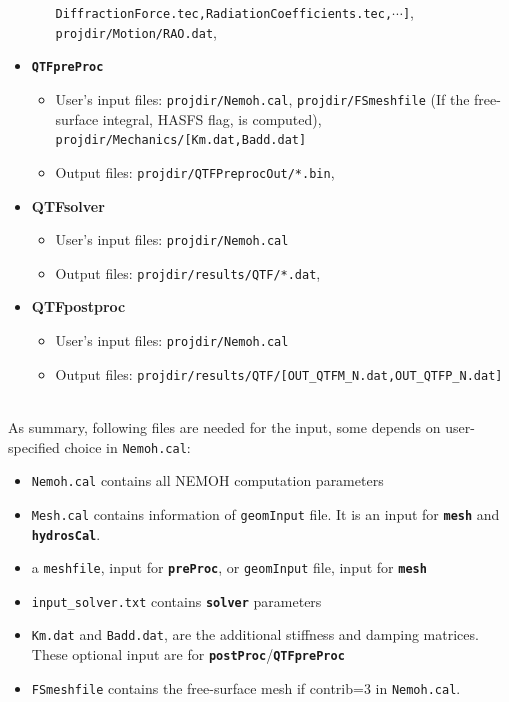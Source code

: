 \documentclass[12pt,a4paper,titlepage]{article}
\begin{document}
\begin{itemize}
\begin{itemize}
\texttt{DiffractionForce.tec,RadiationCoefficients.tec,$\cdots$]},\\ \texttt{projdir/Motion/RAO.dat},
\end{itemize}
\item \texttt{\textbf{QTFpreProc}}
\begin{itemize}
\item User's input files: \texttt{projdir/Nemoh.cal}, \texttt{projdir/FSmeshfile} (If the free-surface integral, HASFS flag, is computed), \\ \texttt{projdir/Mechanics/[Km.dat,Badd.dat]}
\item Output files: \texttt{projdir/QTFPreprocOut/*.bin},
\end{itemize}
\item \textbf{QTFsolver}
\begin{itemize}
\item User's input files: \texttt{projdir/Nemoh.cal}
\item Output files: \texttt{projdir/results/QTF/*.dat},
\end{itemize}
\item \textbf{QTFpostproc}
\begin{itemize}
\item User's input files: \texttt{projdir/Nemoh.cal}
\item Output files: \texttt{projdir/results/QTF/[OUT\_QTFM\_N.dat,OUT\_QTFP\_N.dat]}
\end{itemize}
\end{itemize}
\ \\
As summary, following files are needed for the input, some depends on user-specified choice in \texttt{Nemoh.cal}:
\begin{itemize}
\item \texttt{Nemoh.cal} contains all NEMOH computation parameters
\item \texttt{Mesh.cal} contains information of \texttt{geomInput} file. It is an input for \texttt{\textbf{mesh}} and \texttt{\textbf{hydrosCal}}.
\item a \texttt{meshfile}, input for \texttt{\textbf{preProc}}, or \texttt{geomInput} file, input for \texttt{\textbf{mesh}}
\item \texttt{input\_solver.txt} contains \texttt{\textbf{solver}} parameters
\item \texttt{Km.dat} and \texttt{Badd.dat}, are the additional stiffness and damping matrices. These optional input are for \texttt{\textbf{postProc}}/\texttt{\textbf{QTFpreProc}}
\item \texttt{{FSmeshfile}} contains the free-surface mesh if contrib=3 in \texttt{Nemoh.cal}.
\end{itemize}
\end{document}

